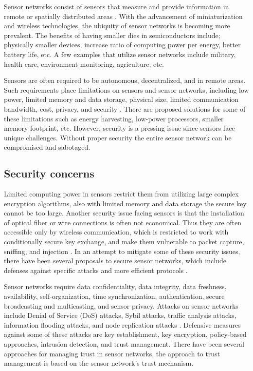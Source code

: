 \documentclass{ws-fnl2}
\begin{document}
Sensor networks consist of sensors that measure and provide information in remote or spatially distributed areas \cite{intro1}. With the advancement of miniaturization and wireless technologies, the ubiquity of sensor networks is becoming more prevalent. The benefits of having smaller dies in semiconductors include; physically smaller devices, increase ratio of computing power per energy, better battery life, etc. A few examples that utilize sensor networks include military, health care, environment monitoring, agriculture, etc.

Sensors are often required to be autonomous, decentralized, and in remote areas. Such requirements place limitations on sensors and sensor networks, including low power, limited memory and data storage, physical size, limited communication bandwidth, cost, privacy, and security \cite{intro2, intro3, intro4}. There are proposed solutions for some of these limitations such as energy harvesting, low-power processors, smaller memory footprint, etc. However, security is a pressing issue since sensors face unique challenges. Without proper security the entire sensor network can be compromised and sabotaged.



\subsection{Security concerns}

Limited computing power in sensors restrict them from utilizing large complex encryption algorithms, also with limited memory and data storage the secure key cannot be too large. Another security issue facing sensors is that the installation of optical fiber or wire connections is often not economical. Thus they are often accessible only by wireless communication, which is restricted to work with conditionally secure key exchange, and make them vulnerable to packet capture, sniffing, and injection \cite{sec1, sec2, sec3, sec4, sec5, sec6, sec7, sec8}. In an attempt to mitigate some of these security issues, there have been several proposals to secure sensor networks, which include defenses against specific attacks and more efficient protocols \cite{sec1, sec2, sec3, sec4, sec5, sec6, sec7, sec8}. 



Sensor networks require data confidentiality, data integrity, data freshness, availability, self-organization, time synchronization, authentication, secure broadcasting and multicasting, and sensor privacy. Attacks on sensor networks include Denial of Service (DoS) attacks, Sybil attacks, traffic analysis attacks, information flooding attacks, and node replication attacks \cite{sec1, sec2, sec3, sec4, sec5, sec6, sec7, sec8}. Defensive measures against some of these attacks are key establishment, key encryption, policy-based approaches, intrusion detection, and trust management. There have been several approaches for managing trust in sensor networks, the approach to trust management is based on the sensor network's trust mechanism.
\end{document}
